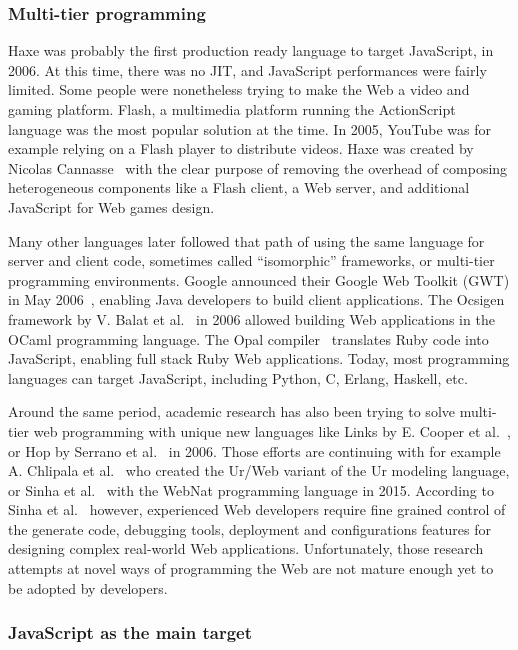 \subsubsection{Multi-tier programming}%
\label{ssub:multitier}

Haxe was probably the first production ready language to target JavaScript, in 2006.
At this time, there was no JIT, and JavaScript performances were fairly limited.
Some people were nonetheless trying to make the Web a video and gaming platform.
Flash, a multimedia platform running the ActionScript language was the most popular solution at the time.
In 2005, YouTube was for example relying on a Flash player to distribute videos.
Haxe was created by Nicolas Cannasse~\cite{haxe-interview} with the clear purpose
of removing the overhead of composing heterogeneous components like a Flash client,
a Web server, and additional JavaScript for Web games design.

Many other languages later followed that path of using the same language
for server and client code, sometimes called ``isomorphic'' frameworks,
or multi-tier programming environments.
Google announced their Google Web Toolkit (GWT) in May 2006~\cite{gwt},
enabling Java developers to build client applications.
The Ocsigen framework by V. Balat et al.~\cite{balat2006ocsigen} in 2006
allowed building Web applications in the OCaml programming language.
The Opal compiler~\cite{opalrb} translates Ruby code into JavaScript,
enabling full stack Ruby Web applications.
Today, most programming languages can target JavaScript,
including Python, C, Erlang, Haskell, etc.

Around the same period, academic research has also been trying to solve
multi-tier web programming with unique new languages like Links
by E. Cooper et al.~\cite{cooper2006links},
or Hop by Serrano et al.~\cite{serrano2006hop} in 2006.
Those efforts are continuing with for example
A. Chlipala et al.~\cite{chlipala2015ur} who created the Ur/Web variant
of the Ur modeling language,
or Sinha et al.~\cite{sinha2015simplifying} with the WebNat programming language in 2015.
According to Sinha et al.~\cite{sinha2015simplifying} however,
experienced Web developers require fine grained control of the generate code,
debugging tools, deployment and configurations features
for designing complex real-world Web applications.
Unfortunately, those research attempts at novel ways of programming the Web
are not mature enough yet to be adopted by developers.

\subsubsection{JavaScript as the main target}%
\label{ssub:javascript_as_the_main_target}

